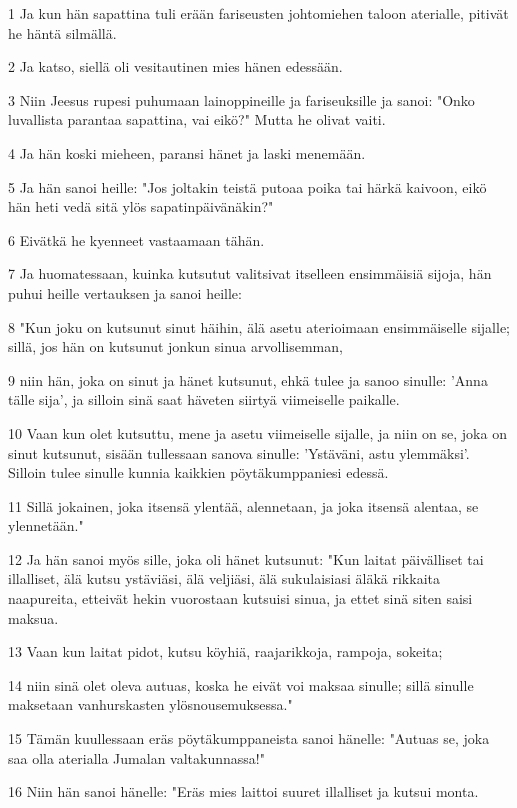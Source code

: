 \par 1 Ja kun hän sapattina tuli erään fariseusten johtomiehen taloon aterialle, pitivät he häntä silmällä.
\par 2 Ja katso, siellä oli vesitautinen mies hänen edessään.
\par 3 Niin Jeesus rupesi puhumaan lainoppineille ja fariseuksille ja sanoi: "Onko luvallista parantaa sapattina, vai eikö?" Mutta he olivat vaiti.
\par 4 Ja hän koski mieheen, paransi hänet ja laski menemään.
\par 5 Ja hän sanoi heille: "Jos joltakin teistä putoaa poika tai härkä kaivoon, eikö hän heti vedä sitä ylös sapatinpäivänäkin?"
\par 6 Eivätkä he kyenneet vastaamaan tähän.
\par 7 Ja huomatessaan, kuinka kutsutut valitsivat itselleen ensimmäisiä sijoja, hän puhui heille vertauksen ja sanoi heille:
\par 8 "Kun joku on kutsunut sinut häihin, älä asetu aterioimaan ensimmäiselle sijalle; sillä, jos hän on kutsunut jonkun sinua arvollisemman,
\par 9 niin hän, joka on sinut ja hänet kutsunut, ehkä tulee ja sanoo sinulle: 'Anna tälle sija', ja silloin sinä saat häveten siirtyä viimeiselle paikalle.
\par 10 Vaan kun olet kutsuttu, mene ja asetu viimeiselle sijalle, ja niin on se, joka on sinut kutsunut, sisään tullessaan sanova sinulle: 'Ystäväni, astu ylemmäksi'. Silloin tulee sinulle kunnia kaikkien pöytäkumppaniesi edessä.
\par 11 Sillä jokainen, joka itsensä ylentää, alennetaan, ja joka itsensä alentaa, se ylennetään."
\par 12 Ja hän sanoi myös sille, joka oli hänet kutsunut: "Kun laitat päivälliset tai illalliset, älä kutsu ystäviäsi, älä veljiäsi, älä sukulaisiasi äläkä rikkaita naapureita, etteivät hekin vuorostaan kutsuisi sinua, ja ettet sinä siten saisi maksua.
\par 13 Vaan kun laitat pidot, kutsu köyhiä, raajarikkoja, rampoja, sokeita;
\par 14 niin sinä olet oleva autuas, koska he eivät voi maksaa sinulle; sillä sinulle maksetaan vanhurskasten ylösnousemuksessa."
\par 15 Tämän kuullessaan eräs pöytäkumppaneista sanoi hänelle: "Autuas se, joka saa olla aterialla Jumalan valtakunnassa!"
\par 16 Niin hän sanoi hänelle: "Eräs mies laittoi suuret illalliset ja kutsui monta.
